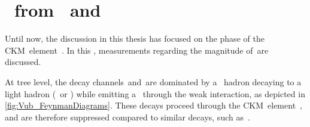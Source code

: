 \clearpage
\section{\abs{\Vub}~from \BdDsPi~and \LbDsP}
\label{sec:VubDsH}

Until now, the discussion in this thesis has focused on the phase of the CKM~element~\Vub.
In this , measurements regarding the magnitude of~\Vub are discussed.

At tree level, the decay channels~\BdDsPi and~\LbDsP are dominated by a \bquark~hadron decaying to a light hadron (\pip~or \proton) while emitting a \Dsm~through the weak interaction, as depicted in \cref{fig:Vub_FeynmanDiagrams}.
These decays proceed through the CKM~element~\Vub, and are therefore suppressed compared to similar decays, such as~\BsDsPi.


